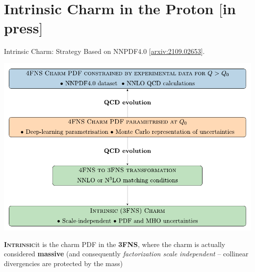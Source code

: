 \documentclass[9pt]{beamer}
\providecommand{\iRef}[1]{{\color{mLightGreen}\small $[$#1$]$}}
\begin{document}
\section{Intrinsic Charm in the Proton \iRef{in press}}

\begin{frame}{Intrinsic Charm: Strategy}
    Based on NNPDF4.0 \iRef{\href{https://arxiv.org/abs/2109.02653}{arxiv:2109.02653}}.

    \begin{center}
        \includegraphics[scale=.6]{strategy}
    \end{center}

    \textsc{\textbf{Intrinsic}}\quad it is the charm PDF in the \textbf{3FNS},
    where the charm is actually considered \alert{\textbf{massive}}
    {\footnotesize (and consequently \textit{factorization scale independent}
    -- collinear divergencies are protected by the mass)}
\end{frame}
\end{document}
